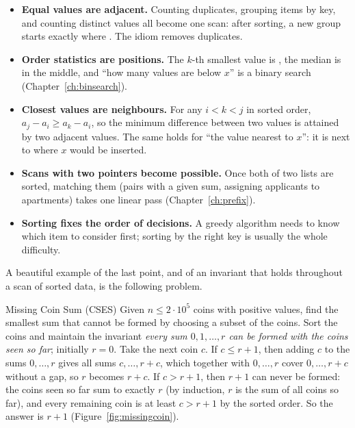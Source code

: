 \begin{itemize}
  \item \textbf{Equal values are adjacent.} Counting duplicates, grouping items by key, and counting distinct values all
        become one scan: after sorting, a new group starts exactly where . The idiom
         removes duplicates.
  \item \textbf{Order statistics are positions.} The $k$-th smallest value is , the median is in the middle,
        and ``how many values are below $x$'' is a binary search (Chapter~\ref{ch:binsearch}).
  \item \textbf{Closest values are neighbours.} For any $i < k < j$ in sorted order, $a_j - a_i \ge a_k - a_i$, so the
        minimum difference between two values is attained by two adjacent values. The same holds for ``the value nearest to
        $x$'': it is next to where $x$ would be inserted.
  \item \textbf{Scans with two pointers become possible.} Once both of two lists are sorted, matching them (pairs with a given
        sum, assigning applicants to apartments) takes one linear pass (Chapter~\ref{ch:prefix}).
  \item \textbf{Sorting fixes the order of decisions.} A greedy algorithm needs to know which item to consider first; sorting
        by the right key is usually the whole difficulty.
\end{itemize}

A beautiful example of the last point, and of an invariant that holds throughout a scan of sorted data, is the following
problem.

\begin{problem}{Missing Coin Sum (CSES)}
Given $n \le 2\cdot10^5$ coins with positive values, find the smallest sum that cannot be formed by choosing a subset of the
coins.
\solution Sort the coins and maintain the invariant \emph{every sum $0, 1, \ldots, r$ can be formed with the coins seen
so far}; initially $r = 0$. Take the next coin $c$. If $c \le r + 1$, then adding $c$ to the sums $0, \ldots, r$ gives all
sums $c, \ldots, r + c$, which together with $0, \ldots, r$ cover $0, \ldots, r + c$ without a gap, so $r$ becomes $r + c$.
If $c > r + 1$, then $r + 1$ can never be formed: the coins seen so far sum to exactly $r$ (by induction, $r$ is the sum of
all coins so far), and every remaining coin is at least $c > r + 1$ by the sorted order. So the answer is $r + 1$
(Figure~\ref{fig:missingcoin}).
\end{problem}


